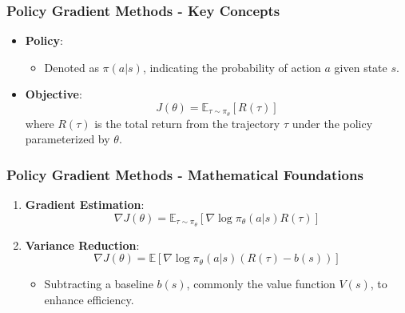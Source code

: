 \documentclass[aspectratio=169]{beamer}
\begin{document}
\begin{frame}[fragile]
    \frametitle{Policy Gradient Methods - Key Concepts}
    \begin{itemize}
        \item \textbf{Policy}:
        \begin{itemize}
            \item Denoted as $\pi(a|s)$, indicating the probability of action $a$ given state $s$.
        \end{itemize}
        
        \item \textbf{Objective}:
        \begin{equation}
            J(\theta) = \mathbb{E}_{\tau \sim \pi_\theta} \left[ R(\tau) \right]
        \end{equation}
        where $R(\tau)$ is the total return from the trajectory $\tau$ under the policy parameterized by $\theta$.
        
    \end{itemize}
\end{frame}

\begin{frame}[fragile]
    \frametitle{Policy Gradient Methods - Mathematical Foundations}
    \begin{enumerate}
        \item \textbf{Gradient Estimation}:
        \begin{equation}
            \nabla J(\theta) = \mathbb{E}_{\tau \sim \pi_\theta} \left[ \nabla \log \pi_\theta(a|s) R(\tau) \right]
        \end{equation}
        \item \textbf{Variance Reduction}:
        \begin{equation}
            \nabla J(\theta) = \mathbb{E} \left[ \nabla \log \pi_\theta(a|s) (R(\tau) - b(s)) \right]
        \end{equation}
        \begin{itemize}
            \item Subtracting a baseline $b(s)$, commonly the value function $V(s)$, to enhance efficiency.
        \end{itemize}
    \end{enumerate}
\end{frame}
\end{document}
